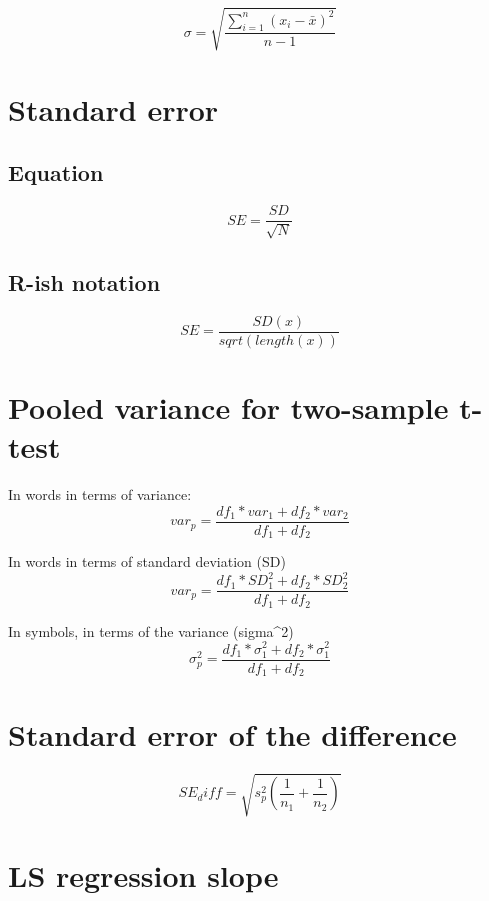 \documentclass[
]{book}
\begin{document}
\[\sigma = \sqrt{\frac{\sum\limits_{i=1}^{n} \left(x_{i} - \bar{x}\right)^{2}} {n-1}}\]

\hypertarget{standard-error}{%
\section{Standard error}\label{standard-error}}

\hypertarget{equation}{%
\subsection{Equation}\label{equation}}

\[SE = \frac{SD}{\sqrt{N}}\]

\hypertarget{r-ish-notation}{%
\subsection{R-ish notation}\label{r-ish-notation}}

\[SE = \frac{SD(x)}{sqrt(length(x))}\]

\hypertarget{pooled-variance-for-two-sample-t-test}{%
\section{Pooled variance for two-sample t-test}\label{pooled-variance-for-two-sample-t-test}}

In words in terms of variance:
\[var_p = {\frac{df_1*var_1 + df_2*var_2}{df_1 + df_2}}\]

In words in terms of standard deviation (SD)
\[var_p = {\frac{df_1*SD^2_1 + df_2*SD^2_2}{df_1 + df_2}}\]

In symbols, in terms of the variance (sigma\^{}2)
\[\sigma^2_p = {\frac{df_1*\sigma^2_1 + df_2*\sigma^2_1}{df_1 + df_2}}\]

\hypertarget{standard-error-of-the-difference}{%
\section{Standard error of the difference}\label{standard-error-of-the-difference}}

\[SE_diff = \sqrt{{s_p^2}(\frac{1}{n_1} + \frac{1}{n_2})} \]

\hypertarget{ls-regression-slope}{%
\section{LS regression slope}\label{ls-regression-slope}}
\end{document}
